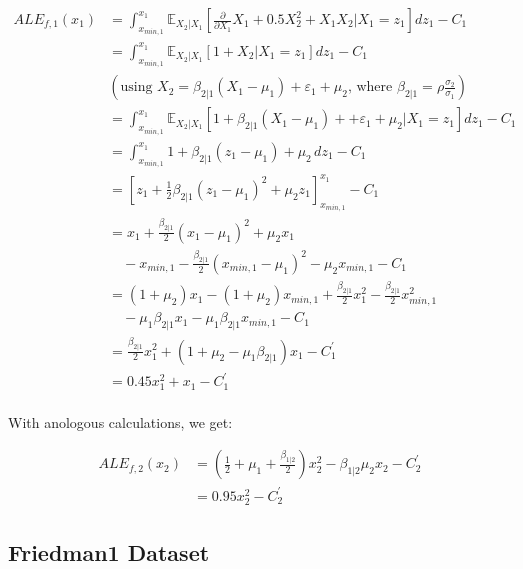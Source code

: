 \documentclass[runningheads]{llncs}
\begin{document}
\begin{align*}
    ALE_{f,1}(x_1) &= \int_{x_{min,1}}^{x_1} \mathbb{E}_{X_2|X_1}\left[\frac{\partial}{\partial X_1} X_1 + 0.5 X_2^2 + X_1X_2 \Big| X_1=z_1\right] dz_1 - C_1 \\
    &= \int_{x_{min,1}}^{x_1} \mathbb{E}_{X_2|X_1}\left[1 + X_2 \Big| X_1=z_1\right] dz_1 - C_1 \\
    &(\text{using } X_2 = \beta_{2|1}(X_1-\mu_1) + \varepsilon_1 + \mu_2\text{, where } \beta_{2|1}=\rho \frac{\sigma_2}{\sigma_1}) \\
    &= \int_{x_{min,1}}^{x_1} \mathbb{E}_{X_2|X_1}\left[1 + \beta_{2|1}(X_1-\mu_1) + + \varepsilon_1 + \mu_2 \Big| X_1=z_1\right] dz_1 - C_1 \\
    &= \int_{x_{min,1}}^{x_1} 1 + \beta_{2|1}(z_1-\mu_1) + \mu_2 \,dz_1 - C_1 \\
    &= [z_1 + \frac{1}{2}\beta_{2|1}(z_1-\mu_1)^2 + \mu_2 z_1]_{x_{min,1}}^{x_1} - C_1 \\
    &= x_1 + \frac{\beta_{2|1}}{2}(x_1-\mu_1)^2 + \mu_2 x_1 \\
    & \quad - x_{min,1} - \frac{\beta_{2|1}}{2}(x_{min,1}-\mu_1)^2 - \mu_2 x_{min,1} - C_1 \\
    &= (1 + \mu_2) x_1 - (1 + \mu_2) x_{min,1} + \frac{\beta_{2|1}}{2} x_1^2 - \frac{\beta_{2|1}}{2} x_{min,1}^2 \\
    & \quad - \mu_1 \beta_{2|1} x_1 - \mu_1 \beta_{2|1}  x_{min,1} - C_1 \\
    &= \frac{\beta_{2|1}}{2} x_1^2 + (1 + \mu_2 - \mu_1 \beta_{2|1}) x_1 - C_1^\prime \\
    &= 0.45 x_1^2 + x_1 - C_1^\prime
\end{align*}
\\

\noindent With anologous calculations, we get:

\begin{align*}
    ALE_{f,2}(x_2) &= (\frac{1}{2} + \mu_1 + \frac{\beta_{1|2}}{2}) x_2^2 - \beta_{1|2} \mu_2 x_2 - C_2^\prime \\
    &= 0.95 x_2^2 - C_2^\prime
\end{align*}


\subsection{Friedman1 Dataset}
\end{document}
